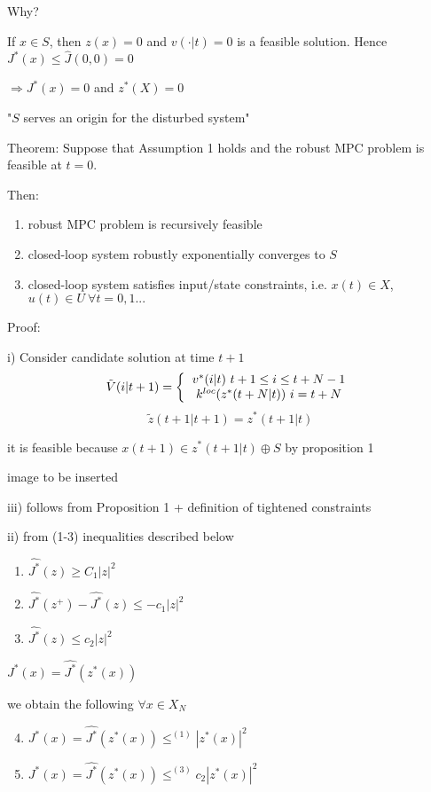 Why? 

If $x \in S$, then $z(x) = 0$ and $v(\cdot|t) = 0$ is a feasible solution. Hence $J^*(x) \leq \hat{J}(0,0) = 0$

$\Rightarrow J^*(x) = 0$ and $z^*(X) = 0$

"$S$ serves an origin for the disturbed system"

Theorem: Suppose that Assumption 1 holds and the robust MPC problem is feasible at $t = 0$.

Then: 
\begin{enumerate}[label=(\roman*)]
\item robust MPC problem is recursively feasible
\item closed-loop system robustly exponentially converges to $S$
\item closed-loop system satisfies input/state constraints, i.e. $x(t) \in X$, $u(t) \in U \ \forall t = 0,1 ...$
\end{enumerate} 

Proof: 

i) Consider candidate solution at time $t+1$ 
\begin{equation*}
\tilde{V}(i|t+1) = \left \{
  \begin{tabular}{c}
  $v^*(i|t) \ t+1 \leq i \leq t+ N -1$ \\
  $k^{loc}(z^*(t+N|t)) \ i = t + N$
  \end{tabular}
\right .
\end{equation*}
\begin{equation*}
\tilde{z}(t+1 | t+1) = z^*(t+1|t)
\end{equation*}

it is feasible because $x(t+1) \in z^*(t+1|t) \oplus S$ by proposition 1

image to be inserted


iii) follows from Proposition 1 + definition of tightened constraints


ii) from (1-3) inequalities described below

\begin{enumerate}
\item $\hat{J^*}(z) \geq C_1|z|^2$
\item $\hat{J^*}(z^+) - \hat{J^*}(z) \leq - c_1 |z|^2$
\item $\hat{J^*}(z) \leq c_2|z|^2$
\end{enumerate}

$J^*(x) = \hat{J^*}(z^*(x))$

we obtain the following $\forall x \in X_N$
\begin{enumerate}
\setcounter{enumi}{3}
\item $J^*(x) = \hat{J^*}(z^*(x)) \leq^{(1)} |z^*(x)|^2$
\item $J^*(x) = \hat{J^*}(z^*(x)) \leq^{(3)} c_2|z^*(x)|^2$
\end{enumerate}

